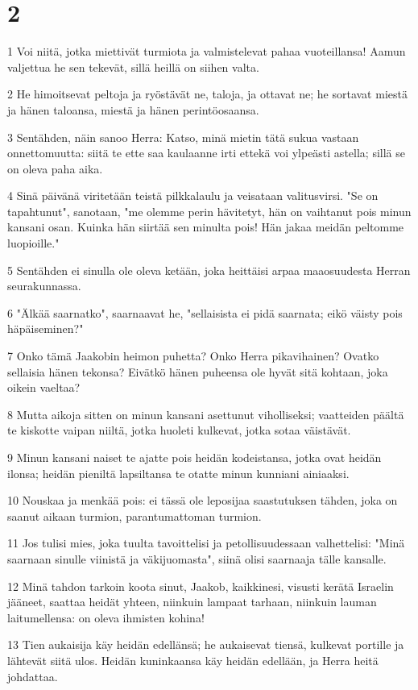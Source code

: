 \chapter{2}

\par 1 Voi niitä, jotka miettivät turmiota ja valmistelevat pahaa vuoteillansa! Aamun valjettua he sen tekevät, sillä heillä on siihen valta.
\par 2 He himoitsevat peltoja ja ryöstävät ne, taloja, ja ottavat ne; he sortavat miestä ja hänen taloansa, miestä ja hänen perintöosaansa.
\par 3 Sentähden, näin sanoo Herra: Katso, minä mietin tätä sukua vastaan onnettomuutta: siitä te ette saa kaulaanne irti ettekä voi ylpeästi astella; sillä se on oleva paha aika.
\par 4 Sinä päivänä viritetään teistä pilkkalaulu ja veisataan valitusvirsi. "Se on tapahtunut", sanotaan, "me olemme perin hävitetyt, hän on vaihtanut pois minun kansani osan. Kuinka hän siirtää sen minulta pois! Hän jakaa meidän peltomme luopioille."
\par 5 Sentähden ei sinulla ole oleva ketään, joka heittäisi arpaa maaosuudesta Herran seurakunnassa.
\par 6 "Älkää saarnatko", saarnaavat he, "sellaisista ei pidä saarnata; eikö väisty pois häpäiseminen?"
\par 7 Onko tämä Jaakobin heimon puhetta? Onko Herra pikavihainen? Ovatko sellaisia hänen tekonsa? Eivätkö hänen puheensa ole hyvät sitä kohtaan, joka oikein vaeltaa?
\par 8 Mutta aikoja sitten on minun kansani asettunut viholliseksi; vaatteiden päältä te kiskotte vaipan niiltä, jotka huoleti kulkevat, jotka sotaa väistävät.
\par 9 Minun kansani naiset te ajatte pois heidän kodeistansa, jotka ovat heidän ilonsa; heidän pieniltä lapsiltansa te otatte minun kunniani ainiaaksi.
\par 10 Nouskaa ja menkää pois: ei tässä ole leposijaa saastutuksen tähden, joka on saanut aikaan turmion, parantumattoman turmion.
\par 11 Jos tulisi mies, joka tuulta tavoittelisi ja petollisuudessaan valhettelisi: "Minä saarnaan sinulle viinistä ja väkijuomasta", siinä olisi saarnaaja tälle kansalle.
\par 12 Minä tahdon tarkoin koota sinut, Jaakob, kaikkinesi, visusti kerätä Israelin jääneet, saattaa heidät yhteen, niinkuin lampaat tarhaan, niinkuin lauman laitumellensa: on oleva ihmisten kohina!
\par 13 Tien aukaisija käy heidän edellänsä; he aukaisevat tiensä, kulkevat portille ja lähtevät siitä ulos. Heidän kuninkaansa käy heidän edellään, ja Herra heitä johdattaa.

